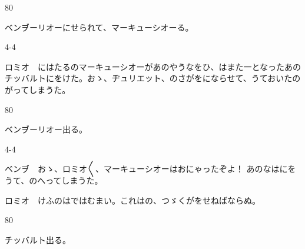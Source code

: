 \documentclass[tate,paper=b6j,jafontsize=9pt]{jlreq}
\begin{document}
\begin{azconvIndented}{8\zw}{0\zw}

ベンヺーリオーにせられて、マーキューシオーる。

\end{azconvIndented}
\begin{azconvIndented}{4\zw}{-4\zw}

ロミオ　にはたるのマーキューシオーがあのやうなをひ、はまた一となったあのチッバルトにをけた。おゝ、ヂュリエット、のさがをにならせて、うておいたのがってしまうた。

\end{azconvIndented}
\begin{azconvIndented}{8\zw}{0\zw}

ベンヺーリオー出る。

\end{azconvIndented}
\begin{azconvIndented}{4\zw}{-4\zw}

ベンヺ　おゝ、ロミオ{〳〵}、マーキューシオーはおにゃったぞよ！ あのなはにをうて、のへってしまうた。

ロミオ　けふのはではむまい。これはの、つゞくがをせねばならぬ。

\end{azconvIndented}
\begin{azconvIndented}{8\zw}{0\zw}

チッバルト出る。

\end{azconvIndented}
\end{document}
